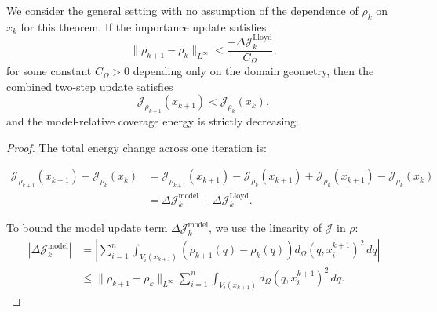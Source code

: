 \documentclass[10pt,a4paper]{amsart}
\begin{document}
\begin{theorem}
\label{thm:1}
We consider the general setting with no assumption of the dependence of $\rho_k$ on $x_k$ for this theorem. 
If the importance update satisfies
\[
    \label{eq:theorem1_condition}
    \|\rho_{k+1} - \rho_k\|_{L^\infty} < \frac{-\Delta \mathcal{J}_k^{\mathrm{Lloyd}}}{C_\Omega},
\]
for some constant \( C_\Omega > 0 \) depending only on the domain geometry, then the combined two-step update satisfies
\[
    \mathcal{J}_{\rho_{k+1}}(x_{k+1}) < \mathcal{J}_{\rho_k}(x_k),
\]
and the model-relative coverage energy is strictly decreasing.
\end{theorem}

\begin{proof}
The total energy change across one iteration is:

\begin{align*}
    \mathcal{J}_{\rho_{k+1}}(x_{k+1}) - \mathcal{J}_{\rho_k}(x_k)
    &= \mathcal{J}_{\rho_{k+1}}(x_{k+1}) - \mathcal{J}_{\rho_k}(x_{k+1})
    + \mathcal{J}_{\rho_k}(x_{k+1}) - \mathcal{J}_{\rho_k}(x_k)
    \\
    &= \Delta\mathcal{J}_k^{\mathrm{model}} + \Delta\mathcal{J}_k^{\mathrm{Lloyd}}.
\end{align*} %

To bound the model update term $\Delta\mathcal{J}_k^{\mathrm{model}}$, we use the linearity of $\mathcal{J}$ in $\rho$:
\begin{align*}
    |\Delta\mathcal{J}_k^{\mathrm{model}}| 
    &= \left| \sum_{i=1}^n \int_{V_i(x_{k+1})} \left( \rho_{k+1}(q) - \rho_k(q) \right) d_\Omega(q, x_i^{k+1})^2 \, dq \right|
    \\
    &\leq \|\rho_{k+1} - \rho_k\|_{L^\infty} \sum_{i=1}^n \int_{V_i(x_{k+1})} d_\Omega(q, x_i^{k+1})^2 \, dq.
\end{align*}


\end{proof}
\end{document}
